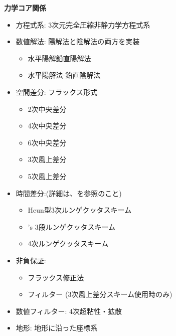 {\bf 力学コア関係}
\begin{itemize}
 \item 方程式系: 3次元完全圧縮非静力学方程式系
 \item 数値解法: 陽解法と陰解法の両方を実装
   \begin{itemize}
    \item 水平陽解鉛直陽解法
    \item 水平陽解法-鉛直陰解法
   \end{itemize}
 \item 空間差分: フラックス形式
    \begin{itemize}
      \item 2次中央差分
      \item 4次中央差分
      \item 6次中央差分
      \item 3次風上差分
      \item 5次風上差分
    \end{itemize}
 \item 時間差分:(詳細は、\citet{scale_2015}を参照のこと)
    \begin{itemize}
      \item Heun型3次ルンゲクッタスキーム
      \item \citet{Wicker_2002}'s 3段ルンゲクッタスキーム 
      \item 4次ルンゲクッタスキーム
    \end{itemize}
 \item 非負保証:
    \begin{itemize}
      \item フラックス修正法 \citep[Flux Corrected Transport, FCT; ][]{zalesak_1979}\\
      \item \citet{Koren_1993}フィルター  (3次風上差分スキーム使用時のみ)
    \end{itemize}
 \item 数値フィルター: 4次超粘性・拡散
 \item 地形: 地形に沿った座標系
\end{itemize}


